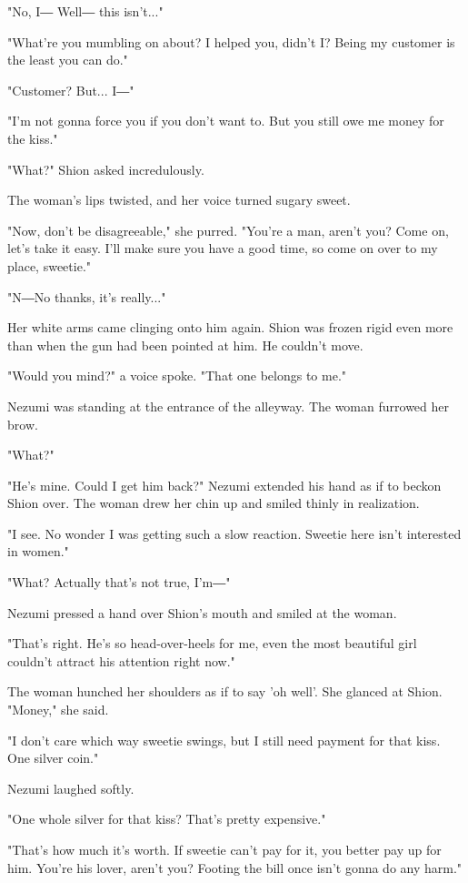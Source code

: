 "No, I― Well― this isn't..."

"What're you mumbling on about? I helped you, didn't I? Being my
customer is the least you can do."

"Customer? But... I―"

"I'm not gonna force you if you don't want to. But you still owe me
money for the kiss."

"What?" Shion asked incredulously.

The woman's lips twisted, and her voice turned sugary sweet.

"Now, don't be disagreeable," she purred. "You're a man, aren't you?
Come on, let's take it easy. I'll make sure you have a good time, so
come on over to my place, sweetie."

"N―No thanks, it's really..."

Her white arms came clinging onto him again. Shion was frozen rigid even
more than when the gun had been pointed at him. He couldn't move.

"Would you mind?" a voice spoke. "That one belongs to me."

Nezumi was standing at the entrance of the alleyway. The woman furrowed
her brow.

"What?"

"He's mine. Could I get him back?" Nezumi extended his hand as if to
beckon Shion over. The woman drew her chin up and smiled thinly in
realization.

"I see. No wonder I was getting such a slow reaction. Sweetie here isn't
interested in women."

"What? Actually that's not true, I'm―"

Nezumi pressed a hand over Shion's mouth and smiled at the woman.

"That's right. He's so head-over-heels for me, even the most beautiful
girl couldn't attract his attention right now."

The woman hunched her shoulders as if to say 'oh well'. She glanced at
Shion. "Money," she said.

"I don't care which way sweetie swings, but I still need payment for
that kiss. One silver coin."

Nezumi laughed softly.

"One whole silver for that kiss? That's pretty expensive."

"That's how much it's worth. If sweetie can't pay for it, you better pay
up for him. You're his lover, aren't you? Footing the bill once isn't
gonna do any harm."

